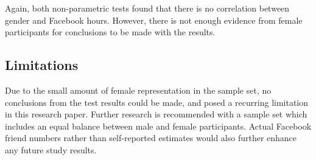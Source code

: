 Again, both non-parametric tests found that there is no correlation between gender and Facebook hours. However, there is not enough evidence from female participants for conclusions to be made with the results.

\subsection{Limitations}

Due to the small amount of female representation in the sample set, no conclusions from the test results could be made, and posed a recurring limitation in this research paper. Further research is recommended with a sample set which includes an equal balance between male and female participants. Actual Facebook friend numbers rather than self-reported estimates would also further enhance any future study results.